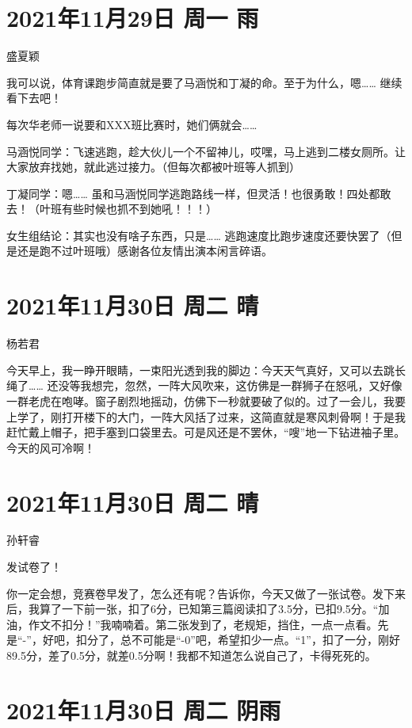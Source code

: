 \section{2021年11月29日 周一 雨}

盛夏颖

我可以说，体育课跑步简直就是要了马涵悦和丁凝的命。至于为什么，嗯…… 继续看下去吧！

每次华老师一说要和XXX班比赛时，她们俩就会……

马涵悦同学：飞速逃跑，趁大伙儿一个不留神儿，哎嘿，马上逃到二楼女厕所。让大家放弃找她，就此逃过接力。（但每次都被叶班等人抓到）

丁凝同学：嗯…… 虽和马涵悦同学逃跑路线一样，但灵活！也很勇敢！四处都敢去！（叶班有些时候也抓不到她吼！！！）

女生组结论：其实也没有啥子东西，只是…… 逃跑速度比跑步速度还要快罢了（但是还是跑不过叶班哦）感谢各位友情出演本闲言碎语。

\section{2021年11月30日 周二 晴}

杨若君

今天早上，我一睁开眼睛，一束阳光透到我的脚边：今天天气真好，又可以去跳长绳了…… 还没等我想完，忽然，一阵大风吹来，这仿佛是一群狮子在怒吼，又好像一群老虎在咆哮。窗子剧烈地摇动，仿佛下一秒就要破了似的。过了一会儿，我要上学了，刚打开楼下的大门，一阵大风括了过来，这简直就是寒风刺骨啊！于是我赶忙戴上帽子，把手塞到口袋里去。可是风还是不罢休，“嗖”地一下钻进袖子里。今天的风可冷啊！

\section{2021年11月30日 周二 晴}

孙轩睿

发试卷了！

你一定会想，竞赛卷早发了，怎么还有呢？告诉你，今天又做了一张试卷。发下来后，我算了一下前一张，扣了6分，已知第三篇阅读扣了3.5分，已扣9.5分。“加油，作文不扣分！”我喃喃着。第二张发到了，老规矩，挡住，一点一点看。先是“-”，好吧，扣分了，总不可能是“-0”吧，希望扣少一点。“1”，扣了一分，刚好89.5分，差了0.5分，就差0.5分啊！我都不知道怎么说自己了，卡得死死的。

\section{2021年11月30日 周二 阴雨}

